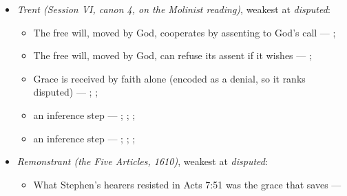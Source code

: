 \documentclass[11pt]{article}
\begin{document}
\begin{itemize}
\begin{itemize}
\item Grace truly sufficient, giving the power to do good, is resisted --- \cite[ch. VI]{garrigou-lagrange-grace-1952}
\item Justifying grace, once given, can be lost --- \cite[II-II q.24 a.11]{aquinas-summa-1920}; \cite[Trent, Session VI (1547), canon 23]{tanner-decrees-1990}
\item Grace is received by faith alone (encoded as a denial, so it ranks disputed) --- \cite[II-II q.4 a.3]{aquinas-summa-1920}; \cite[I-II q.113 a.4 ad 1]{aquinas-summa-1920}; \cite[Trent, Session VI (1547), canon 9]{tanner-decrees-1990}
\item an inference step --- \cite{pohle-molinism-1911}; \cite[I-II q.112 a.3]{aquinas-summa-1920}; \cite[ch. VII]{garrigou-lagrange-grace-1952}
\end{itemize}
\item \emph{Trent (Session VI, canon 4, on the Molinist reading)}, weakest at \emph{disputed}:
\begin{itemize}
\item The free will, moved by God, cooperates by assenting to God’s call --- \cite[Trent, Session VI (1547), canon 4]{tanner-decrees-1990}; \cite[45]{waterworth-trent-1848}
\item The free will, moved by God, can refuse its assent if it wishes --- \cite[Trent, Session VI (1547), canon 4]{tanner-decrees-1990}; \cite[45]{waterworth-trent-1848}
\item Grace is received by faith alone (encoded as a denial, so it ranks disputed) --- \cite[Augsburg Confession IV.1–3]{concordia-triglotta-1921}; \cite[Sermon 1, III.1]{wesley-sermons-1872}; \cite[Trent, Session VI (1547), canon 9]{tanner-decrees-1990}
\item an inference step --- \cite[I-II q.111 a.2]{aquinas-summa-1920}; \cite[Canons of Dort, III/IV, art. 12]{schaff-creeds-christendom-3-1977}; \cite[Trent, Session VI (1547), canon 4]{tanner-decrees-1990}; \cite[45]{waterworth-trent-1848}
\item an inference step --- \cite[I-II q.10 a.4 ad 3]{aquinas-summa-1920}; \cite[I-II q.112 a.3]{aquinas-summa-1920}; \cite[Trent, Session VI (1547), canon 4]{tanner-decrees-1990}; \cite[45]{waterworth-trent-1848}
\end{itemize}
\item \emph{Remonstrant (the Five Articles, 1610)}, weakest at \emph{disputed}:
\begin{itemize}
\item What Stephen’s hearers resisted in Acts 7:51 was the grace that saves --- \cite[Five Arminian Articles (1610), art. 4]{schaff-creeds-christendom-3-1977}

\end{itemize}
\end{itemize}
\end{document}
